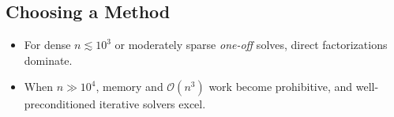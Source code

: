 
\subsection{Choosing a Method}
\begin{itemize}
    \item For dense $n\lesssim 10^{3}$ or moderately sparse \emph{one-off} solves, direct factorizations dominate.
    \item When $n\gg 10^{4}$, memory and $\mathcal{O}(n^{3})$ work become prohibitive, and well-preconditioned iterative solvers excel.
\end{itemize}

